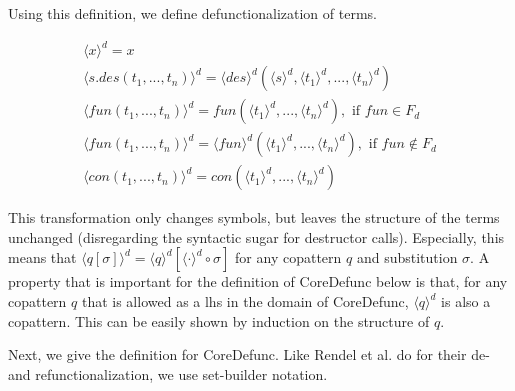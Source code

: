 Using this definition, we define defunctionalization of terms.

\begin{align*}
\langle x \rangle^d = x \\
\langle s.des(t_1, ..., t_n) \rangle^d = \langle des \rangle^d (\langle s \rangle^d, \langle t_1 \rangle^d, ..., \langle t_n \rangle^d) \\
\langle fun(t_1, ..., t_n) \rangle^d = fun(\langle t_1 \rangle^d, ..., \langle t_n \rangle^d), \text{ if } fun \in F_d \\
\langle fun(t_1, ..., t_n) \rangle^d = \langle fun \rangle^d (\langle t_1 \rangle^d, ..., \langle t_n \rangle^d), \text{ if } fun \not\in F_d \\
\langle con(t_1, ..., t_n) \rangle^d = con(\langle t_1 \rangle^d, ..., \langle t_n \rangle^d)
\end{align*}

This transformation only changes symbols, but leaves the structure of the terms unchanged (disregarding the syntactic sugar for destructor calls). Especially, this means that $\langle q[\sigma] \rangle^d = \langle q \rangle^d [\langle \cdot \rangle^d \circ \sigma]$ for any copattern $q$ and substitution $\sigma$. A property that is important for the definition of \textsf{CoreDefunc} below is that, for any copattern $q$ that is allowed as a lhs in the domain of \textsf{CoreDefunc}, $\langle q \rangle^d$ is also a copattern. This can be easily shown by induction on the structure of $q$.

Next, we give the definition for \textsf{CoreDefunc}. Like Rendel et al. do for their de- and refunctionalization, we use set-builder notation.

